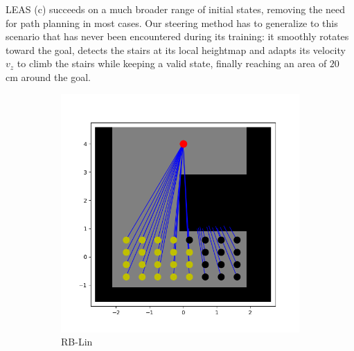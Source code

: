 LEAS (c) succeeds on a much broader range of initial states, removing the need for path planning in most cases. Our steering method has to generalize to this scenario that has never been encountered during its training: it smoothly rotates toward the goal, detects the stairs at its local heightmap and adapts its velocity $v_z$ to climb the stairs while keeping a valid state, finally reaching an area of $20$ cm around the goal.

\begin{figure}
    \centering
    \captionsetup[subfigure]{justification=centering}
    \begin{subfigure}[t]{0.49\linewidth}
    \includegraphics[width=\textwidth]{Figures/Chapter_LEAS/hole_p1_lin.png}
    \caption{RB-Lin}
    \end{subfigure}
    \begin{subfigure}[t]{0.49\linewidth}

\end{subfigure}
\end{figure}
